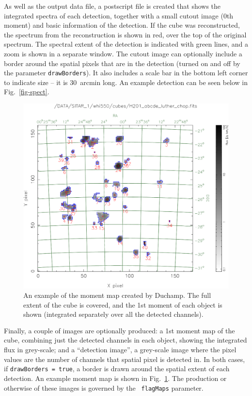 \documentclass[12pt]{article}
\begin{document}
As well as the output data file, a postscript file is created that
shows the integrated spectra of each detection, together with a small
cutout image (0th moment) and basic information of the detection. If
the cube was reconstructed, the spectrum from the reconstruction is
shown in red, over the top of the original spectrum. The spectral
extent of the detection is indicated with green lines, and a zoom is
shown in a separate window. 
The cutout image can optionally include a
border around the spatial pixels that are in the detection (turned on
and off by the parameter {\tt drawBorders}). It also includes a scale bar
in the bottom left corner to indicate size -- it is 30~arcmin long. An
example detection can be seen below in Fig.~\ref{fig-spect}.

\begin{figure}[!t]
\begin{center}
\includegraphics[width=\textwidth]{example_moment_map}
\end{center}
\caption{An example of the moment map created by Duchamp. The full
  extent of the cube is covered, and the 1st moment of each object is
  shown (integrated separately over all the detected channels).}
\label{fig-moment}
\end{figure}

Finally, a couple of images are optionally produced: a 1st moment map
of the cube, combining just the detected channels in each object,
showing the integrated flux in grey-scale; and a ``detection image'',
a grey-scale image where the pixel values are the number of channels
that spatial pixel is detected in. In both cases, if {\tt drawBorders =
true}, a border is drawn around the spatial extent of each
detection. An example moment map is shown in Fig.~\ref{fig-moment}.
The production or otherwise of these images is governed by the {\tt
flagMaps} parameter.
\end{document}
